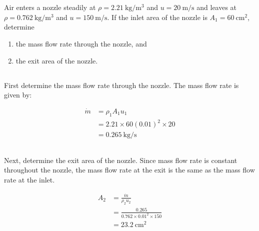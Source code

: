 \section{}
Air enters a nozzle steadily at $\rho = \qty{2.21}{\kilogram\per\meter\cubed}$ and $u = \qty{20}{\meter\per\second}$ and leaves at 
$\rho = \qty{0.762}{\kilogram\per\meter\cubed}$ and $u = \qty{150}{\meter\per\second}$. If the inlet area of the nozzle is 
$A_1 = \qty{60}{\centi\meter\squared}$, determine

\begin{enumerate}[label=(\alph*)]
    \item the mass flow rate through the nozzle, and
    \item the exit area of the nozzle.
\end{enumerate}


\subsection{}
First determine the mass flow rate through the nozzle. The mass flow rate is given by:

\[
\begin{aligned}
    \dot{m} &= \rho_1 A_1 u_1 \\
    &= 2.21 \times 60 (0.01)^2 \times 20 \\
    &= \boxed{\qty{0.265}{\kilogram\per\second}}
\end{aligned}
\]

\subsection{}
Next, determine the exit area of the nozzle. Since mass flow rate is constant throughout the nozzle, 
the mass flow rate at the exit is the same as the mass flow rate at the inlet. 

\[
\begin{aligned}
    A_2 &= \frac{\dot{m}}{\rho_2 u_2} \\
    &= \frac{0.265}{0.762 \times 0.01^2 \times 150} \\
    &= \boxed{\qty{23.2}{\centi\meter\squared}}
\end{aligned}
\]

